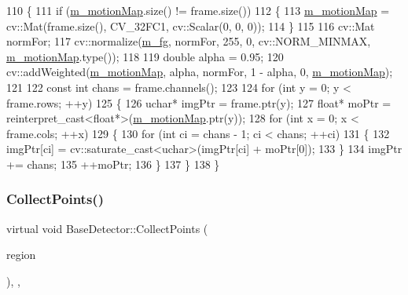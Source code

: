\begin{DoxyCode}
110 \{
111     \textcolor{keywordflow}{if} (\mbox{\hyperlink{class_base_detector_a45a2d54a0b69e271aa5c44ee301682b7}{m\_motionMap}}.size() != frame.size())
112     \{
113         \mbox{\hyperlink{class_base_detector_a45a2d54a0b69e271aa5c44ee301682b7}{m\_motionMap}} = cv::Mat(frame.size(), CV\_32FC1, cv::Scalar(0, 0, 0));
114     \}
115 
116     cv::Mat normFor;
117     cv::normalize(\mbox{\hyperlink{class_motion_detector_ac751815be986935ac095aff5428b6c24}{m\_fg}}, normFor, 255, 0, cv::NORM\_MINMAX, \mbox{\hyperlink{class_base_detector_a45a2d54a0b69e271aa5c44ee301682b7}{m\_motionMap}}.type());
118 
119     \textcolor{keywordtype}{double} alpha = 0.95;
120     cv::addWeighted(\mbox{\hyperlink{class_base_detector_a45a2d54a0b69e271aa5c44ee301682b7}{m\_motionMap}}, alpha, normFor, 1 - alpha, 0, 
      \mbox{\hyperlink{class_base_detector_a45a2d54a0b69e271aa5c44ee301682b7}{m\_motionMap}});
121 
122     \textcolor{keyword}{const} \textcolor{keywordtype}{int} chans = frame.channels();
123 
124     \textcolor{keywordflow}{for} (\textcolor{keywordtype}{int} y = 0; y < frame.rows; ++y)
125     \{
126         uchar* imgPtr = frame.ptr(y);
127         \textcolor{keywordtype}{float}* moPtr = \textcolor{keyword}{reinterpret\_cast<}\textcolor{keywordtype}{float}*\textcolor{keyword}{>}(\mbox{\hyperlink{class_base_detector_a45a2d54a0b69e271aa5c44ee301682b7}{m\_motionMap}}.ptr(y));
128         \textcolor{keywordflow}{for} (\textcolor{keywordtype}{int} x = 0; x < frame.cols; ++x)
129         \{
130             \textcolor{keywordflow}{for} (\textcolor{keywordtype}{int} ci = chans - 1; ci < chans; ++ci)
131             \{
132                 imgPtr[ci] = cv::saturate\_cast<uchar>(imgPtr[ci] + moPtr[0]);
133             \}
134             imgPtr += chans;
135             ++moPtr;
136         \}
137     \}
138 \}
\end{DoxyCode}
\mbox{\label{class_base_detector_a20380b0980c6f262b0829f37fb89d2a7}} 
\subsubsection{\texorpdfstring{Collect\+Points()}{CollectPoints()}}
{\footnotesize\ttfamily virtual void Base\+Detector\+::\+Collect\+Points (\begin{DoxyParamCaption}\item[{\mbox{\hyperlink{class_c_region}{C\+Region}} \&}]{region }\end{DoxyParamCaption})\hspace{0.3cm}{\ttfamily [inline]}, {\ttfamily [virtual]}, {\ttfamily [inherited]}}



